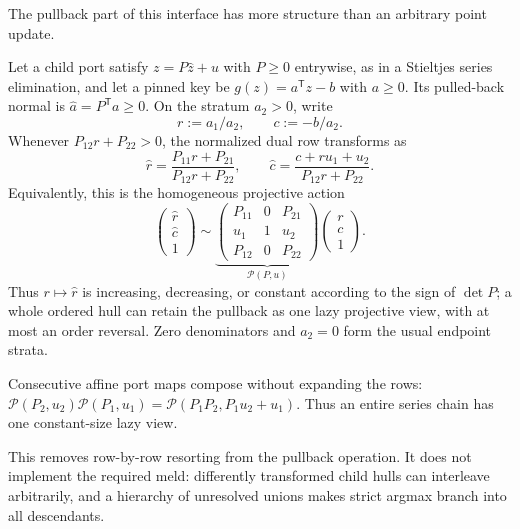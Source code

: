 The pullback part of this interface has more structure than an arbitrary
point update.

\begin{lemma}
\label{lem:aesp-cd-two-port-projective-pullback}
Let a child port satisfy $z=P\widehat z+u$ with $P\geq0$ entrywise, as in a
Stieltjes series elimination, and let a pinned key be
$g(z)=a^{\mathsf T}z-b$ with $a\geq0$.  Its pulled-back normal is
$\widehat a=P^{\mathsf T}a\geq0$.  On the stratum $a_2>0$, write
\begin{equation*}
 r:=a_1/a_2,\qquad c:=-b/a_2.
\end{equation*}
Whenever $P_{12}r+P_{22}>0$, the normalized dual row transforms as
\begin{equation}
 \widehat r=\frac{P_{11}r+P_{21}}{P_{12}r+P_{22}},
 \qquad
 \widehat c=\frac{c+r u_1+u_2}{P_{12}r+P_{22}}.
 \label{eq:aesp-cd-two-port-projective-pullback}
\end{equation}
Equivalently, this is the homogeneous projective action
\begin{equation*}
 \begin{pmatrix}\widehat r\\ \widehat c\\ 1\end{pmatrix}
 \sim
 \underbrace{\begin{pmatrix}
   P_{11}&0&P_{21}\\
   u_1&1&u_2\\
   P_{12}&0&P_{22}
 \end{pmatrix}}_{\mathcal P(P,u)}
 \begin{pmatrix}r\\ c\\ 1\end{pmatrix}.
\end{equation*}
Thus $r\mapsto\widehat r$ is increasing, decreasing, or constant according
to the sign of $\det P$; a whole ordered hull can retain the pullback as one
lazy projective view, with at most an order reversal.  Zero denominators and
$a_2=0$ form the usual endpoint strata.

Consecutive affine port maps compose without expanding the rows:
$\mathcal P(P_2,u_2)\mathcal P(P_1,u_1)
=\mathcal P(P_1P_2,P_1u_2+u_1)$.  Thus an entire series chain has one
constant-size lazy view.

This removes row-by-row resorting from the pullback operation.  It does not
implement the required meld: differently transformed child hulls can
interleave arbitrarily, and a hierarchy of unresolved unions makes strict
argmax branch into all descendants.
\end{lemma}

